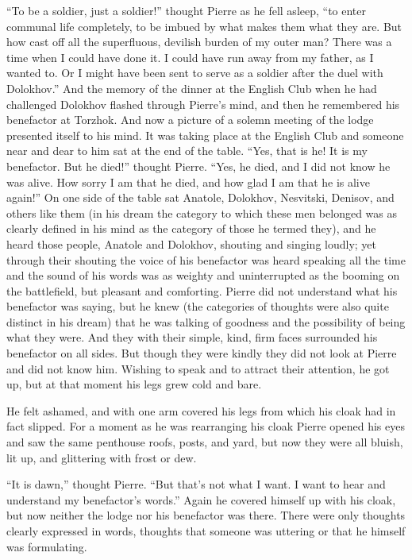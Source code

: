 ``To be a soldier, just a soldier!'' thought Pierre as he fell
asleep, ``to enter communal life completely, to be imbued by what
makes them what they are. But how cast off all the superfluous,
devilish burden of my outer man? There was a time when I could
have done it. I could have run away from my father, as I wanted
to. Or I might have been sent to serve as a soldier after the
duel with Dolokhov.'' And the memory of the dinner at the English
Club when he had challenged Dolokhov flashed through Pierre's
mind, and then he remembered his benefactor at Torzhok. And now a
picture of a solemn meeting of the lodge presented itself to his
mind.  It was taking place at the English Club and someone near
and dear to him sat at the end of the table. ``Yes, that is he!
It is my benefactor. But he died!'' thought Pierre. ``Yes, he
died, and I did not know he was alive. How sorry I am that he
died, and how glad I am that he is alive again!'' On one side of
the table sat Anatole, Dolokhov, Nesvitski, Denisov, and others
like them (in his dream the category to which these men belonged
was as clearly defined in his mind as the category of those he
termed they), and he heard those people, Anatole and Dolokhov,
shouting and singing loudly; yet through their shouting the voice
of his benefactor was heard speaking all the time and the sound
of his words was as weighty and uninterrupted as the booming on
the battlefield, but pleasant and comforting. Pierre did not
understand what his benefactor was saying, but he knew (the
categories of thoughts were also quite distinct in his dream)
that he was talking of goodness and the possibility of being what
they were. And they with their simple, kind, firm faces
surrounded his benefactor on all sides. But though they were
kindly they did not look at Pierre and did not know him. Wishing
to speak and to attract their attention, he got up, but at that
moment his legs grew cold and bare.

He felt ashamed, and with one arm covered his legs from which his
cloak had in fact slipped. For a moment as he was rearranging his
cloak Pierre opened his eyes and saw the same penthouse roofs,
posts, and yard, but now they were all bluish, lit up, and
glittering with frost or dew.

``It is dawn,'' thought Pierre. ``But that's not what I want. I
want to hear and understand my benefactor's words.'' Again he
covered himself up with his cloak, but now neither the lodge nor
his benefactor was there.  There were only thoughts clearly
expressed in words, thoughts that someone was uttering or that he
himself was formulating.

